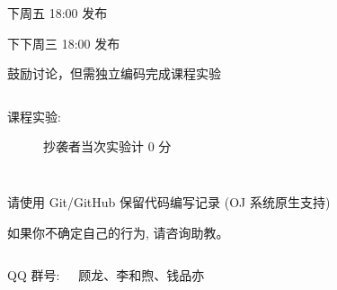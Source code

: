 \begin{frame}{}
  \begin{center}
      下周五 18:00 发布 \\[5pt]

    \vspace{0.10cm}

    \vspace{0.10cm}
      下下周三 18:00 发布 \\[5pt]
  \end{center}
\end{frame}

\begin{frame}
  \begin{center}
    鼓励讨论，但需独立编码完成课程实验
  \end{center}

  \pause
  \begin{columns}
    \begin{description}
      \item[课程实验:] 抄袭者当次实验计 $0$ 分
    \end{description}
  \end{columns}
\end{frame}

\begin{frame}
  \begin{center}
    请使用 Git/GitHub 保留代码编写记录 (OJ 系统原生支持)

    \vspace{0.50cm}
    如果你不确定自己的行为, 请咨询助教。
  \end{center}
\end{frame}

\begin{frame}{}
  \begin{columns}
    \begin{center}
      QQ 群号: 

    \end{center}
    \begin{center}
      {\bf {}} 顾龙、李和煦、钱品亦
    \end{center}
  \end{columns}
\end{frame}

